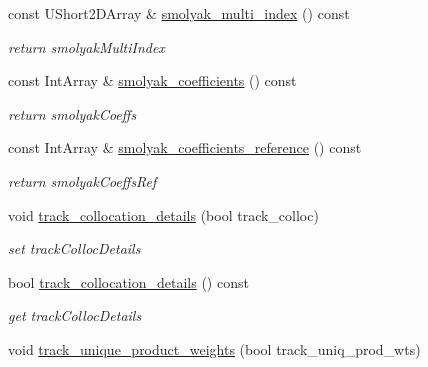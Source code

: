 \begin{DoxyCompactItemize}
\item 
const U\+Short2\+D\+Array \& \hyperlink{classPecos_1_1CombinedSparseGridDriver_ac2a92a30d8aedcaf8bcae6097915948d}{smolyak\+\_\+multi\+\_\+index} () const \label{classPecos_1_1CombinedSparseGridDriver_ac2a92a30d8aedcaf8bcae6097915948d}

\begin{DoxyCompactList}\small\item\em return smolyak\+Multi\+Index \end{DoxyCompactList}\item 
const Int\+Array \& \hyperlink{classPecos_1_1CombinedSparseGridDriver_a8a02db8b3454c187db2cc6b7f266ec3c}{smolyak\+\_\+coefficients} () const \label{classPecos_1_1CombinedSparseGridDriver_a8a02db8b3454c187db2cc6b7f266ec3c}

\begin{DoxyCompactList}\small\item\em return smolyak\+Coeffs \end{DoxyCompactList}\item 
const Int\+Array \& \hyperlink{classPecos_1_1CombinedSparseGridDriver_a33a5f4fce5d456312c5ecb7579d34795}{smolyak\+\_\+coefficients\+\_\+reference} () const \label{classPecos_1_1CombinedSparseGridDriver_a33a5f4fce5d456312c5ecb7579d34795}

\begin{DoxyCompactList}\small\item\em return smolyak\+Coeffs\+Ref \end{DoxyCompactList}\item 
void \hyperlink{classPecos_1_1CombinedSparseGridDriver_a23ac0b95407480a7249cfc1fbe7a28c1}{track\+\_\+collocation\+\_\+details} (bool track\+\_\+colloc)\label{classPecos_1_1CombinedSparseGridDriver_a23ac0b95407480a7249cfc1fbe7a28c1}

\begin{DoxyCompactList}\small\item\em set track\+Colloc\+Details \end{DoxyCompactList}\item 
bool \hyperlink{classPecos_1_1CombinedSparseGridDriver_a556842b57e24ec3cf901368e19a2d423}{track\+\_\+collocation\+\_\+details} () const \label{classPecos_1_1CombinedSparseGridDriver_a556842b57e24ec3cf901368e19a2d423}

\begin{DoxyCompactList}\small\item\em get track\+Colloc\+Details \end{DoxyCompactList}\item 
void \hyperlink{classPecos_1_1CombinedSparseGridDriver_aa21b9e5a18f0c713987587e7bb88b6de}{track\+\_\+unique\+\_\+product\+\_\+weights} (bool track\+\_\+uniq\+\_\+prod\+\_\+wts)\label{classPecos_1_1CombinedSparseGridDriver_aa21b9e5a18f0c713987587e7bb88b6de}


\end{DoxyCompactItemize}
